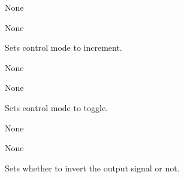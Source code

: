 \documentclass[letterpaper,10pt,english]{sphinxmanual}
\begin{document}
\begin{fulllineitems}
\begin{fulllineitems}
\sphinxAtStartPar
{}

\sphinxAtStartPar
None

\sphinxAtStartPar
{}

\sphinxAtStartPar
None

\end{fulllineitems}


\begin{fulllineitems}
\label{\detokenize{specific:EarOutput.EarOutput.set_control_increment}}
\sphinxAtStartPar
Sets control mode to increment.

\sphinxAtStartPar
{}

\sphinxAtStartPar
None

\sphinxAtStartPar
{}

\sphinxAtStartPar
None

\end{fulllineitems}


\begin{fulllineitems}
\label{\detokenize{specific:EarOutput.EarOutput.set_control_toggle}}
\sphinxAtStartPar
Sets control mode to toggle.

\sphinxAtStartPar
{}

\sphinxAtStartPar
None

\sphinxAtStartPar
{}

\sphinxAtStartPar
None

\end{fulllineitems}


\begin{fulllineitems}
\label{\detokenize{specific:EarOutput.EarOutput.set_inversion}}
\sphinxAtStartPar
Sets whether to invert the output signal or not.


\end{fulllineitems}
\end{fulllineitems}
\end{document}
